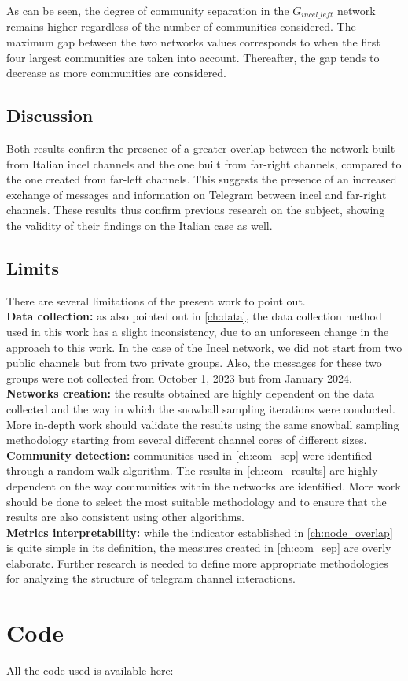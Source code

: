 \documentclass[a4paper,twoside,12pt, openany]{book}
\begin{document}
As can be seen, the degree of community separation in the $G_{incel\_left}$ network remains higher regardless of the number of communities considered. The maximum gap between the two networks values corresponds to when the first four largest communities are taken into account. Thereafter, the gap tends to decrease as more communities are considered.

\section{Discussion}
Both results confirm the presence of a greater overlap between the network built from Italian incel channels and the one built from far-right channels, compared to the one created from far-left channels. This suggests the presence of an increased exchange of messages and information on Telegram between incel and far-right channels. These results thus confirm previous research on the subject, showing the validity of their findings on the Italian case as well. 

\section{Limits}
There are several limitations of the present work to point out.\\
\textbf{Data collection:} as also pointed out in \ref{ch:data}, the data collection method used in this work has a slight inconsistency, due to an unforeseen change in the approach to this work. In the case of the Incel network, we did not start from two public channels but from two private groups. Also, the messages for these two groups were not collected from October 1, 2023 but from January 2024.\\
\textbf{Networks creation:} the results obtained are highly dependent on the data collected and the way in which the snowball sampling iterations were conducted. More in-depth work should validate the results using the same snowball sampling methodology starting from several different channel cores of different sizes.\\
\textbf{Community detection:} communities used in \ref{ch:com_sep} were identified through a random walk algorithm. The results in \ref{ch:com_results} are highly dependent on the way communities within the networks are identified. More work should be done to select the most suitable methodology and to ensure that the results are also consistent using other algorithms.\\
\textbf{Metrics interpretability:} while the indicator established in \ref{ch:node_overlap} is quite simple in its definition, the measures created in \ref{ch:com_sep} are overly elaborate. Further research is needed to define more appropriate methodologies for analyzing the structure of telegram channel interactions.

\chapter{Code}
All the code used is available here: 


\backmatter


\titleformat{\chapter}[display]
{\normalfont\bfseries}{}{-3em}{\Huge}

\listoffigures
\listoftables
\tableofcontents
\end{document}

